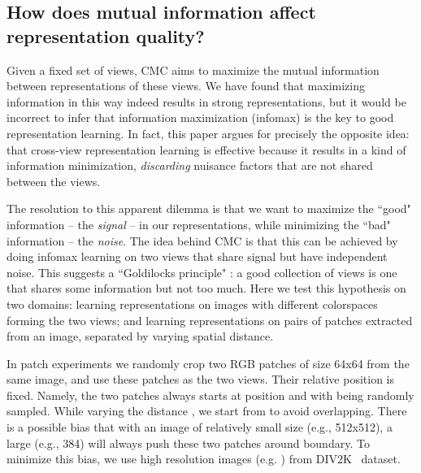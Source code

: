 \documentclass[10pt,twocolumn,letterpaper]{article}
\newcommand{\citep}[1]{\cite{#1}}
\begin{document}
 \subsection{How does mutual information affect representation quality?}\label{sec:color_space}


Given a fixed set of views, CMC aims to maximize the mutual information between representations of these views. We have found that maximizing information in this way indeed results in strong representations, but it would be incorrect to infer that information maximization (infomax) is the key to good representation learning. In fact, this paper argues for precisely the opposite idea: that cross-view representation learning is effective because it results in a kind of information minimization, \emph{discarding} nuisance factors that are not shared between the views.

The resolution to this apparent dilemma is that we want to maximize the ``good" information -- the \emph{signal} -- in our representations, while minimizing the ``bad" information -- the \emph{noise}. The idea behind CMC is that this can be achieved by doing infomax learning on two views that share signal but have independent noise. This suggests a ``Goldilocks principle" \cite{kidd2012goldilocks}: a good collection of views is one that shares some information but not too much. Here we test this hypothesis on two domains: learning representations on images with different colorspaces forming the two views; and learning representations on pairs of patches extracted from an image, separated by varying spatial distance. 

In patch experiments we randomly crop two RGB patches of size 64x64 from the same image, and use these patches as the two views. Their relative position is fixed. Namely, the two patches always starts at position  and  with  being randomly sampled. While varying the distance , we start from  to avoid overlapping. There is a possible bias that with an image of relatively small size (e.g., 512x512), a large  (e.g., 384) will always push these two patches around boundary. To minimize this bias, we use high resolution images (e.g. ) from DIV2K~\citep{agustsson2017ntire} dataset.
\end{document}
